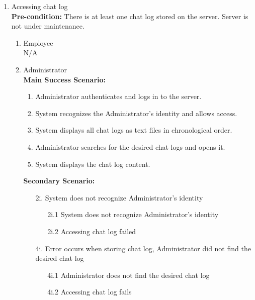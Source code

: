 \documentclass[]{article}
\begin{document}
\begin{enumerate}[{\bf BE1.}]
\begin{enumerate}[{\bf BE8.}]
	\item Accessing chat log \\
        \textbf{Pre-condition:} There is at least one chat log stored on the server. Server is not under maintenance. 
		\begin{enumerate}[{\bf VP1.}]
			\item Employee \\
   				N/A
		  \item Administrator \\
		\textbf{Main Success Scenario:}
                \begin{enumerate}[{  1.}]
                    \item Administrator authenticates and logs in to the server. 
		    \item System recognizes the Administrator’s identity and allows access.  
                    \item System displays all chat logs as text files in chronological order. 
                    \item Administrator searches for the desired chat logs and opens it. 
                    \item System displays the chat log content.  
                \end{enumerate}
                \textbf{Secondary Scenario:}
                \begin{enumerate}
		    \item[2i.] System does not recognize Administrator’s identity
                    \begin{enumerate}
                        \item[2i.1] System does not recognize Administrator’s identity
                        \item[2i.2] Accessing chat log failed
                    \end{enumerate}
                    \item[4i.]  Error occurs when storing chat log, Administrator did not find the desired chat log
                    \begin{enumerate}
                        \item[4i.1] Administrator does not find the desired chat log
                        \item[4i.2] Accessing chat log fails
                    \end{enumerate}
                \end{enumerate}

\end{enumerate}
\end{enumerate}
\end{enumerate}
\end{document}
